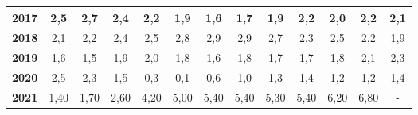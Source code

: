 \begin{center}
\begin{footnotesize}
\begin{longtable}{|c|c|c|c|c|c|c|c|c|c|c|c|c|}
\hline 
\textbf{2017} & 2,5 & 2,7 & 2,4 & 2,2 & 1,9 & 1,6 & 1,7 & 1,9 & 2,2 & 2,0 & 2,2 & 2,1  \\ 
\hline 
\textbf{2018} & 2,1 & 2,2 & 2,4 & 2,5 & 2,8 & 2,9 & 2,9 & 2,7 & 2,3 & 2,5 & 2,2 & 1,9  \\ 
\hline 
\textbf{2019} & 1,6 & 1,5 & 1,9 & 2,0 & 1,8 & 1,6 & 1,8 & 1,7 & 1,7 & 1,8 & 2,1 & 2,3  \\ 
\hline 
\textbf{2020} & 2,5 & 2,3 & 1,5 & 0,3 & 0,1 & 0,6 & 1,0 & 1,3 & 1,4 & 1,2 & 1,2 & 1,4  \\ 
\hline
\textbf{2021} & 1,40 & 1,70 & 2,60 & 4,20 & 5,00 & 5,40 & 5,40 & 5,30 & 5,40 & 6,20 & 6,80 & - \\ \hline
\end{longtable}
\end{footnotesize} 
\end{center}